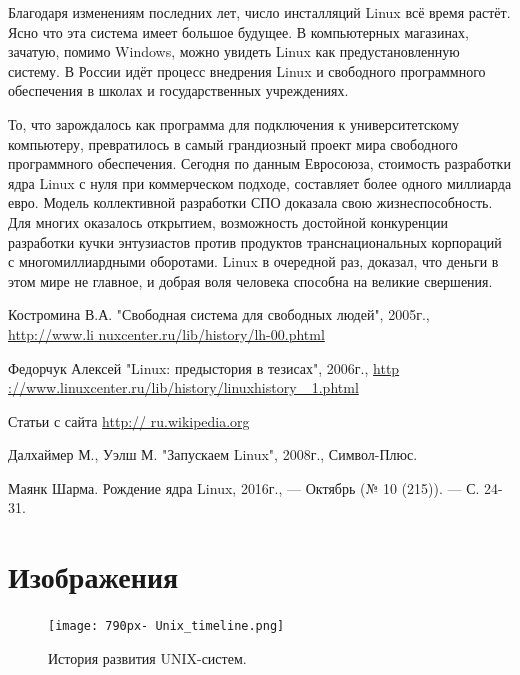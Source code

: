 \documentclass[bachelor, och, referat, times]{SCWorks}
\begin{document}
\par Благодаря изменениям последних лет, число 
инсталляций Linux всё время
растёт. Ясно что эта система имеет большое будущее. 
В компьютерных 
магазинах, зачатую, помимо Windows, можно увидеть 
Linux как 
предустановленную систему. В России идёт процесс 
внедрения Linux и 
свободного программного обеспечения в школах и 
государственных 
учреждениях.

\conclusion

То, что зарождалось как программа для подключения к 
университетскому 
компьютеру, превратилось в самый грандиозный проект 
мира свободного 
программного обеспечения. Сегодня по данным 
Евросоюза, стоимость 
разработки ядра Linux с нуля при коммерческом 
подходе, составляет более 
одного миллиарда евро. Модель коллективной 
разработки СПО доказала свою 
жизнеспособность. Для многих оказалось открытием, 
возможность достойной 
конкуренции разработки кучки энтузиастов против 
продуктов 
транснациональных корпораций с многомиллиардными 
оборотами. Linux в 
очередной раз, доказал, что деньги в этом мире не 
главное, и добрая воля 
человека способна на великие свершения.

\begin{thebibliography}{99}
	 Костромина В.А. "Свободная 
	система для свободных 
	людей", 2005г.,
	\href{http://www.linuxcenter.ru/lib/history/
	lh-00.phtml}{http://www.li
	nuxcenter.ru/lib/history/lh-00.phtml}
	
	 Федорчук Алексей "Linux: 
	предыстория в тезисах", 
	2006г.,
	\href{http://www.linuxcenter.ru/lib/history/
	linuxhistory_1.phtml}{http
	://www.linuxcenter.ru/lib/history/linuxhistory
	\_1.phtml}
	
	 Статьи с сайта
	\href{http://ru.wikipedia.org}{http://
	ru.wikipedia.org}
	
	 Далхаймер М., Уэлш М. 
	"Запускаем Linux", 2008г., 
	Символ-Плюс.
	
	 Маянк Шарма. Рождение ядра 
	Linux, 2016г., — Октябрь (№
	10 (215)). — С. 24-31.
\end{thebibliography}

\appendix

\section{Изображения}

\begin{figure}[h]
    \centering
    \texttt{[image: 790px-
    Unix\_timeline.png]}
    \caption{История развития UNIX-систем.}
    \label{fig:hist}
\end{figure}
\end{document}
